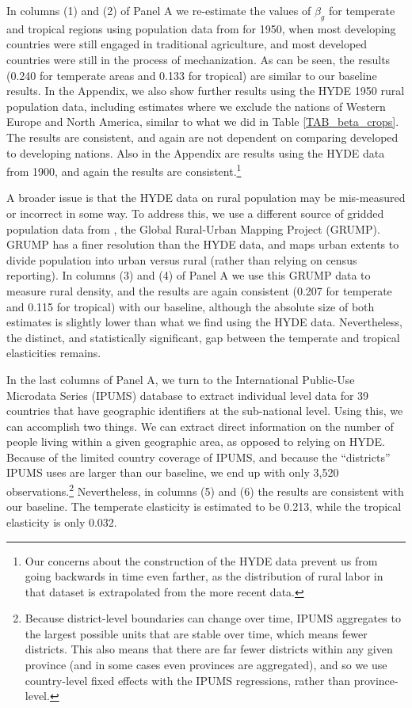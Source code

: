 \documentclass[11pt]{article}
\begin{document}
In columns (1) and (2) of Panel A we re-estimate the values of $\beta_g$ for temperate and tropical regions using population data from \citet{hyde31} for 1950, when most developing countries were still engaged in traditional agriculture, and most developed countries were still in the process of mechanization. As can be seen, the results (0.240 for temperate areas and 0.133 for tropical) are similar to our baseline results. In the Appendix, we also show further results using the HYDE 1950 rural population data, including estimates where we exclude the nations of Western Europe and North America, similar to what we did in Table \ref{TAB_beta_crops}. The results are consistent, and again are not dependent on comparing developed to developing nations. Also in the Appendix are results using the HYDE data from 1900, and again the results are consistent.\footnote{Our concerns about the construction of the HYDE data prevent us from going backwards in time even farther, as the distribution of rural labor in that dataset is extrapolated from the more recent data.}

A broader issue is that the HYDE data on rural population may be mis-measured or incorrect in some way. To address this, we use a different source of gridded population data from \citep{grump2011}, the Global Rural-Urban Mapping Project (GRUMP). GRUMP has a finer resolution than the HYDE data, and maps urban extents to divide population into urban versus rural (rather than relying on census reporting). In columns (3) and (4) of Panel A we use this GRUMP data to measure rural density, and the results are again consistent (0.207 for temperate and 0.115 for tropical) with our baseline, although the absolute size of both estimates is slightly lower than what we find using the HYDE data. Nevertheless, the distinct, and statistically significant, gap between the temperate and tropical elasticities remains.

In the last columns of Panel A, we turn to the International Public-Use Microdata Series (IPUMS) database \nocite{ipums} to extract individual level data for 39 countries that have geographic identifiers at the sub-national level. Using this, we can accomplish two things. We can extract direct information on the number of people living within a given geographic area, as opposed to relying on HYDE. Because of the limited country coverage of IPUMS, and because the ``districts'' IPUMS uses are larger than our baseline, we end up with only 3,520 observations.\footnote{Because district-level boundaries can change over time, IPUMS aggregates to the largest possible units that are stable over time, which means fewer districts. This also means that there are far fewer districts within any given province (and in some cases even provinces are aggregated), and so we use country-level fixed effects with the IPUMS regressions, rather than province-level.} Nevertheless, in columns (5) and (6) the results are consistent with our baseline. The temperate elasticity is estimated to be 0.213, while the tropical elasticity is only 0.032. 
\end{document}
